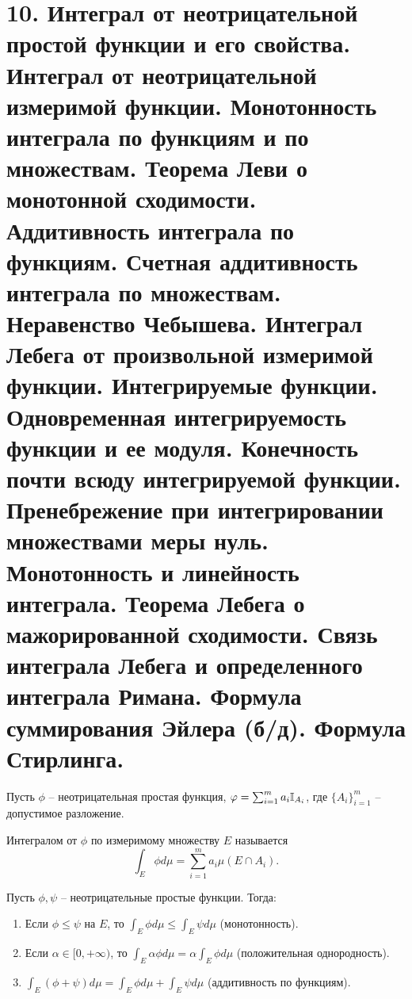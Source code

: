 \section{10. Интеграл от неотрицательной простой функции и его свойства. Интеграл от неотрицательной измеримой функции. Монотонность интеграла по функциям и по множествам. Теорема Леви о монотонной сходимости. Аддитивность интеграла по функциям. Счетная аддитивность интеграла по множествам. Неравенство Чебышева. Интеграл Лебега от произвольной измеримой функции. Интегрируемые функции. Одновременная интегрируемость функции и ее модуля. Конечность почти всюду интегрируемой функции. Пренебрежение при интегрировании множествами меры нуль. Монотонность и линейность интеграла. Теорема Лебега о мажорированной сходимости. Связь интеграла Лебега и определенного интеграла Римана. Формула суммирования Эйлера (б/д). Формула Стирлинга.}

\begin{definition}
    Пусть $\phi$ -- неотрицательная простая функция, $\varphi = \sum_{i = 1}^{m}a_{i} \mathbb{I}_{A_{i}}$, где $\{A_{i}\}_{i = 1}^{m}$ -- допустимое разложение.

    Интегралом от $\phi$ по измеримому множеству $E$ называется
    \[\int_{E}\phi d\mu = \sum_{i = 1}^{m}a_{i}\mu(E \cap A_{i}).\]
\end{definition}

\begin{lemma}
    Пусть $\phi, \psi$ -- неотрицательные простые функции. Тогда:
    \begin{enumerate}
        \item Если $\phi \leq \psi$ на $E$, то $\int_{E}\phi d\mu \leq \int_{E}\psi d\mu$ (монотонность).
        \item Если $\alpha \in [0, +\infty)$, то $\int_{E}\alpha\phi d\mu = \alpha \int_{E}\phi d\mu$ (положительная однородность).
        \item $\int_{E}(\phi + \psi) d\mu = \int_{E}\phi d\mu + \int_{E}\psi d\mu$ (аддитивность по функциям).
    \end{enumerate}
\end{lemma}

